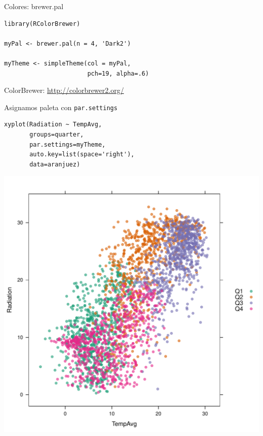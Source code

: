 \documentclass[xcolor={usenames,svgnames,dvipsnames}]{beamer}
\begin{document}
\begin{frame}[fragile,label=sec-6-1-17]{Colores: brewer.pal}
 \lstset{language=R,label= ,caption= ,numbers=none}
\begin{lstlisting}
library(RColorBrewer)

myPal <- brewer.pal(n = 4, 'Dark2')

myTheme <- simpleTheme(col = myPal,
                       pch=19, alpha=.6)
\end{lstlisting}

\begin{block}{ColorBrewer: \url{http://colorbrewer2.org/}}
\end{block}
\end{frame}

\begin{frame}[fragile,label=sec-6-1-18]{Asignamos paleta con \texttt{par.settings}}
 \lstset{language=R,label= ,caption= ,numbers=none}
\begin{lstlisting}
xyplot(Radiation ~ TempAvg,
       groups=quarter,
       par.settings=myTheme,
       auto.key=list(space='right'),
       data=aranjuez)
\end{lstlisting}
\end{frame}

\begin{frame}[label=sec-6-1-19]{}
\includegraphics[width=.9\linewidth]{figs/brewer.pdf}
\end{frame}
\end{document}
